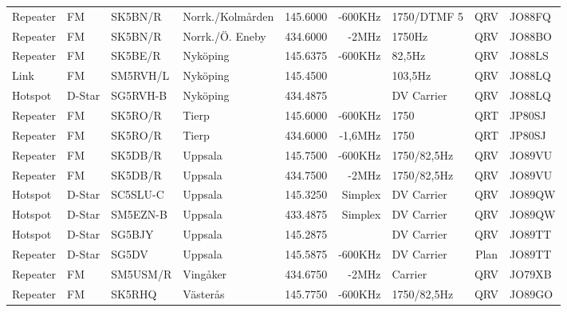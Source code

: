\begin{landscape}
\begin{longtable}{llllrrlcl}
	Repeater                  & FM            & SK5BN/R       & Norrk./Kolmården    & 145.6000          & -600KHz        & 1750/DTMF 5      & QRV             & JO88FQ           \\
	Repeater                  & FM            & SK5BN/R       & Norrk./Ö. Eneby     & 434.6000          & -2MHz          & 1750Hz           & QRV             & JO88BO           \\
	Repeater                  & FM            & SK5BE/R       & Nyköping            & 145.6375          & -600KHz        & 82,5Hz           & QRV             & JO88LS           \\
	Link                      & FM            & SM5RVH/L      & Nyköping            & 145.4500          &                & 103,5Hz          & QRV             & JO88LQ           \\
	Hotspot                   & D-Star        & SG5RVH-B      & Nyköping            & 434.4875          &                & DV Carrier       & QRV             & JO88LQ           \\
	Repeater                  & FM            & SK5RO/R       & Tierp               & 145.6000          & -600KHz        & 1750             & QRT             & JP80SJ           \\
	Repeater                  & FM            & SK5RO/R       & Tierp               & 434.6000          & -1,6MHz        & 1750             & QRT             & JP80SJ           \\
	Repeater                  & FM            & SK5DB/R       & Uppsala             & 145.7500          & -600KHz        & 1750/82,5Hz      & QRV             & JO89VU           \\
	Repeater                  & FM            & SK5DB/R       & Uppsala             & 434.7500          & -2MHz          & 1750/82,5Hz      & QRV             & JO89VU           \\
	Hotspot                   & D-Star        & SC5SLU-C      & Uppsala             & 145.3250          & Simplex        & DV Carrier       & QRV             & JO89QW           \\
	Hotspot                   & D-Star        & SM5EZN-B      & Uppsala             & 433.4875          & Simplex        & DV Carrier       & QRV             & JO89QW           \\
	Hotspot                   & D-Star        & SG5BJY        & Uppsala             & 145.2875          &                & DV Carrier       & QRV             & JO89TT           \\
	Repeater                  & D-Star        & SG5DV         & Uppsala             & 145.5875          & -600KHz        & DV Carrier       & Plan            & JO89TT           \\
	Repeater                  & FM            & SM5USM/R      & Vingåker            & 434.6750          & -2MHz          & Carrier          & QRV             & JO79XB           \\
	Repeater                  & FM            & SK5RHQ        & Västerås            & 145.7750          & -600KHz        & 1750/82,5Hz      & QRV             & JO89GO
\end{longtable}
\normalsize

\end{landscape}
